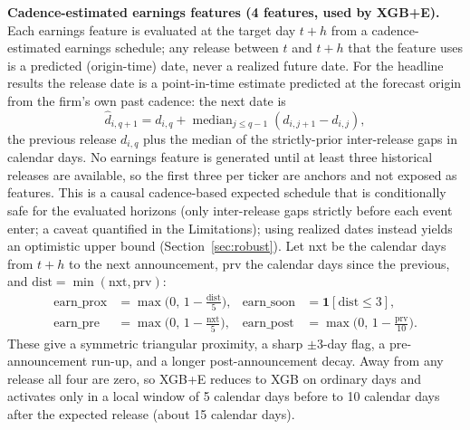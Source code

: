 \documentclass[runningheads,a4paper]{llncs}
\begin{document}
\textbf{Cadence-estimated earnings features (4 features, used by XGB+E).} Each earnings feature is evaluated
at the target day $t+h$ from a cadence-estimated earnings schedule; any release between $t$ and $t+h$ that
the feature uses is a predicted (origin-time) date, never a realized future date. For the headline results
the release date is a point-in-time estimate predicted at the forecast origin from the firm's own past
cadence: the next date is
\[ \hat d_{i,q+1} = d_{i,q} + \operatorname{median}_{j\le q-1}\left(d_{i,j+1}-d_{i,j}\right), \]
the previous release $d_{i,q}$ plus the median of the strictly-prior inter-release gaps in calendar days.
No earnings feature is generated until at least three historical releases are available, so the first three
per ticker are anchors and not exposed as features. This is a causal cadence-based expected schedule that is
conditionally safe for the evaluated horizons (only inter-release gaps strictly before each event enter; a
caveat quantified in the Limitations); using realized dates instead yields an optimistic upper bound
(Section~\ref{sec:robust}). Let $\mathrm{nxt}$ be the calendar days from $t+h$ to
the next announcement, $\mathrm{prv}$ the calendar days since the previous, and
$\mathrm{dist}=\min(\mathrm{nxt},\mathrm{prv})$:
\begin{align}
\mathrm{earn\_prox} &= \max\!\Big(0,\,1-\tfrac{\mathrm{dist}}{5}\Big), &
\mathrm{earn\_soon} &= \mathbf{1}[\mathrm{dist}\le 3],\\
\mathrm{earn\_pre} &= \max\!\Big(0,\,1-\tfrac{\mathrm{nxt}}{5}\Big), &
\mathrm{earn\_post} &= \max\!\Big(0,\,1-\tfrac{\mathrm{prv}}{10}\Big).
\end{align}
These give a symmetric triangular proximity, a sharp $\pm 3$-day flag, a pre-announcement run-up, and a
longer post-announcement decay. Away from any release all four are zero, so XGB+E reduces to XGB on ordinary
days and activates only in a local window of 5 calendar days before to 10 calendar days after the expected
release (about 15 calendar days).
\end{document}
